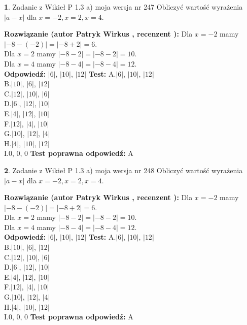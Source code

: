 \documentclass[12pt, a4paper]{article}
\theoremstyle{definition} %
\newtheorem{zad}{}
\newcommand{\zadStart}[1]{\begin{zad}#1\newline}
\newcommand{\zadStop}{\end{zad}}
\newcommand{\rozwStart}[2]{\noindent \textbf{Rozwiązanie (autor #1 , recenzent #2): }\newline}
\newcommand{\rozwStop}{\newline}
\newcommand{\odpStart}{\noindent \textbf{Odpowiedź:}\newline}
\newcommand{\odpStop}{\newline}
\newcommand{\testStart}{\noindent \textbf{Test:}\newline}
\newcommand{\testStop}{\newline}
\newcommand{\kluczStart}{\noindent \textbf{Test poprawna odpowiedź:}\newline}
\newcommand{\kluczStop}{\newline}
\begin{document}
\zadStart{Zadanie z Wikieł P 1.3 a) moja wersja nr 247}
Obliczyć wartość wyrażenia $|a - x|$ dla $x=-2,x=2,x=4$.
\zadStop
\rozwStart{Patryk Wirkus}{}
Dla $x = -2$ mamy $|-8 - (-2)| = |-8 + 2| = 6$.\\
Dla $x = 2$ mamy $|-8 - 2| = |-8 - 2| = 10$.\\
Dla $x = 4$ mamy $|-8 - 4| = |-8 - 4| = 12$.\\
\rozwStop
\odpStart
$|6|$, $|10|$, $|12|$
\odpStop
\testStart
A.$|6|$, $|10|$, $|12|$\\
B.$|10|$, $|6|$, $|12|$\\
C.$|12|$, $|10|$, $|6|$\\
D.$|6|$, $|12|$, $|10|$\\
E.$|4|$, $|12|$, $|10|$\\
F.$|12|$, $|4|$, $|10|$\\
G.$|10|$, $|12|$, $|4|$\\
H.$|4|$, $|10|$, $|12|$\\
I.$0$, $0$, $0$
\testStop
\kluczStart
A
\kluczStop



\zadStart{Zadanie z Wikieł P 1.3 a) moja wersja nr 248}
Obliczyć wartość wyrażenia $|a - x|$ dla $x=-2,x=2,x=4$.
\zadStop
\rozwStart{Patryk Wirkus}{}
Dla $x = -2$ mamy $|-8 - (-2)| = |-8 + 2| = 6$.\\
Dla $x = 2$ mamy $|-8 - 2| = |-8 - 2| = 10$.\\
Dla $x = 4$ mamy $|-8 - 4| = |-8 - 4| = 12$.\\
\rozwStop
\odpStart
$|6|$, $|10|$, $|12|$
\odpStop
\testStart
A.$|6|$, $|10|$, $|12|$\\
B.$|10|$, $|6|$, $|12|$\\
C.$|12|$, $|10|$, $|6|$\\
D.$|6|$, $|12|$, $|10|$\\
E.$|4|$, $|12|$, $|10|$\\
F.$|12|$, $|4|$, $|10|$\\
G.$|10|$, $|12|$, $|4|$\\
H.$|4|$, $|10|$, $|12|$\\
I.$0$, $0$, $0$
\testStop
\kluczStart
A
\kluczStop
\end{document}
